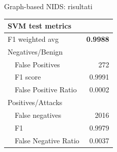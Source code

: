   \begin{frame}{Graph-based NIDS: risultati}
    \begin{center}
      \begin{tabular}{llr}
      \multicolumn{3}{l}{\textbf{SVM test metrics}} \\\midrule
      \multicolumn{2}{l}{F1 weighted avg} & \textbf{0.9988} \\[2mm]
      \multicolumn{3}{l}{Negatives/Benign} \\
       & False Positives & 272 \\
       & F1 score & 0.9991 \\
       & False Positive Ratio & 0.0002 \\[2mm]
      \multicolumn{3}{l}{Positives/Attacks} \\
       & False negatives & 2016 \\
       & F1 & 0.9979 \\
       & False Negative Ratio & 0.0037 \\ \bottomrule
      \end{tabular}
    \end{center}
  \end{frame}
  
  